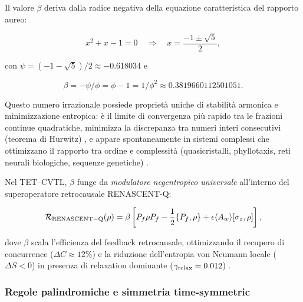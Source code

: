 \documentclass[11pt,a4paper]{article}
\let\oldcite\cite
\renewcommand{\cite}{\protect\oldcite}
\theoremstyle{plain}
\theoremstyle{definition}
\begin{document}
\vspace{0.3cm}

Il valore $\beta$ deriva dalla radice negativa della equazione caratteristica del rapporto aureo:

\begin{equation}
x^2 + x - 1 = 0 \quad \Rightarrow \quad x = \frac{-1 \pm \sqrt{5}}{2},
\label{eq:golden_equation}
\end{equation}

con $\psi = (-1 - \sqrt{5})/2 \approx -0.618034$ e

\begin{equation}
\beta = -\psi / \phi = \phi - 1 = 1/\phi^2 \approx 0.3819660112501051.
\label{eq:beta_definition}
\end{equation}

\vspace{0.3cm}

Questo numero irrazionale possiede proprietà uniche di stabilità armonica e minimizzazione entropica: è il limite di convergenza più rapido tra le frazioni continue quadratiche, minimizza la discrepanza tra numeri interi consecutivi (teorema di Hurwitz) \cite{hurwitz1891}, e appare spontaneamente in sistemi complessi che ottimizzano il rapporto tra ordine e complessità (quasicristalli, phyllotaxis, reti neurali biologiche, sequenze genetiche) \cite{petoukhov2020golden}. 

\vspace{0.4cm}

Nel TET–CVTL, $\beta$ funge da \emph{modulatore negentropico universale} all'interno del superoperatore retrocausale RENASCENT-Q:

\begin{equation}
\mathcal{R}_{\rm RENASCENT-Q}(\rho) = \beta \left[ P_f \rho P_f - \frac{1}{2} \{P_f, \rho\} + \epsilon \langle A_w \rangle [\sigma_z, \rho] \right],
\label{eq:renascent_beta}
\end{equation}

dove $\beta$ scala l'efficienza del feedback retrocausale, ottimizzando il recupero di concurrence ($\Delta C \approx 12\%$) e la riduzione dell'entropia von Neumann locale ($\Delta S < 0$) in presenza di relaxation dominante ($\gamma_{\rm relax} = 0.012$) \cite{hameroff2014consciousness}.

\clearpage

\subsubsection{Regole palindromiche e simmetria time-symmetric}
\end{document}
